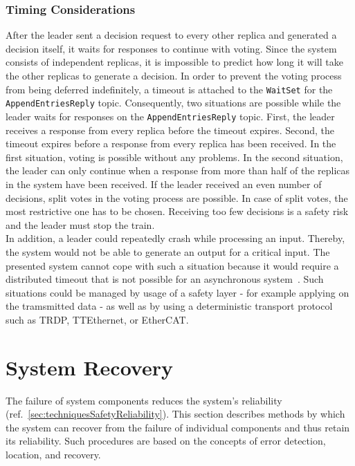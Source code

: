 \subsubsection{Timing Considerations}

After the leader sent a decision request to every other replica and generated a decision itself, it waits for responses to continue with voting.
Since the system consists of independent replicas, it is impossible to predict how long it will take the other replicas to generate a decision.
In order to prevent the voting process from being deferred indefinitely, a timeout is attached to the \texttt{WaitSet} for the \texttt{AppendEntriesReply} topic.
Consequently, two situations are possible while the leader waits for responses on the \texttt{AppendEntriesReply} topic.
First, the leader receives a response from every replica before the timeout expires.
Second, the timeout expires before a response from every replica has been received.
In the first situation, voting is possible without any problems.
In the second situation, the leader can only continue when a response from more than half of the replicas in the system have been received.
If the leader received an even number of decisions, split votes in the voting process are possible.
In case of split votes, the most restrictive one has to be chosen.
Receiving too few decisions is a safety risk and the leader must stop the train.
\\

In addition, a leader could repeatedly crash while processing an input.
Thereby, the system would not be able to generate an output for a critical input.
The presented system cannot cope with such a situation because it would require a distributed timeout that is not possible for an asynchronous system~\cite{FLPProblemConsensus}.
Such situations could be managed by usage of a safety layer - for example applying  on the tramsmitted data -  as well as by using a deterministic transport protocol~\cite{DeterministicTransport} such as TRDP, TTEthernet, or EtherCAT.

\section{System Recovery}

The failure of system components reduces the system's reliability (ref.~\autoref{sec:techniquesSafetyReliability}).
This section describes methods by which the system can recover from the failure of individual components and thus retain its reliability.
Such procedures are based on the concepts of error detection, location, and recovery.
\\

